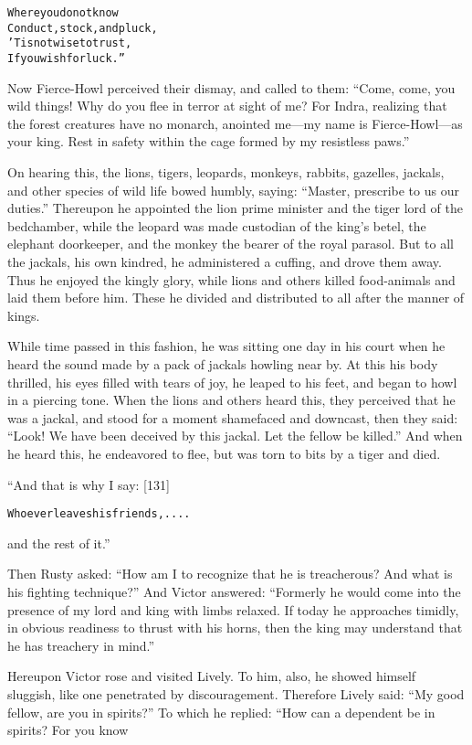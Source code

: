 \documentclass{article}
\renewenvironment{verbatim}{\begin{alltt}\normalfont\begin{centering}}{\end{centering}\end{alltt}}
\begin{document}
\begin{verbatim}
Where you do not know
    Conduct, stock, and pluck,
'Tis not wise to trust,
    If you wish for luck.”
\end{verbatim}
Now Fierce-Howl perceived their dismay, and called to them:
``Come, come, you wild things! Why do you flee in terror at sight of me? For Indra, realizing that the forest creatures have no monarch, anointed me---my name is Fierce-Howl---as your king. Rest in safety within the cage formed by my resistless paws.''

On hearing this, the lions, tigers, leopards, monkeys, rabbits,
gazelles, jackals, and other species of wild life bowed humbly,
saying: ``Master, prescribe to us our duties.'' Thereupon he
appointed the lion prime minister and the tiger lord of the
bedchamber, while the leopard was made custodian of the king's
betel, the elephant doorkeeper, and the monkey the bearer of the
royal parasol. But to all the jackals, his own kindred, he
administered a cuffing, and drove them away. Thus he enjoyed the
kingly glory, while lions and others killed food-animals and laid
them before him. These he divided and distributed to all after the
manner of kings.

While time passed in this fashion, he was sitting one day in his
court when he heard the sound made by a pack of jackals howling
near by. At this his body thrilled, his eyes filled with tears of
joy, he leaped to his feet, and began to howl in a piercing tone.
When the lions and others heard this, they perceived that he was a
jackal, and stood for a moment shamefaced and downcast, then they
said:
``Look! We have been deceived by this jackal. Let the fellow be killed.''
And when he heard this, he endeavored to flee, but was torn to bits
by a tiger and died.

“And that is why I say: [131]

\begin{verbatim}
Whoever leaves his friends, ....
\end{verbatim}
and the rest of it.”

Then Rusty asked:
``How am I to recognize that he is treacherous? And what is his fighting technique?''
And Victor answered:
``Formerly he would come into the presence of my lord and king with limbs relaxed. If today he approaches timidly, in obvious readiness to thrust with his horns, then the king may understand that he has treachery in mind.''

Hereupon Victor rose and visited Lively. To him, also, he showed
himself sluggish, like one penetrated by discouragement. Therefore
Lively said: ``My good fellow, are you in spirits?'' To which he
replied: “How can a dependent be in spirits? For you know
\end{document}
